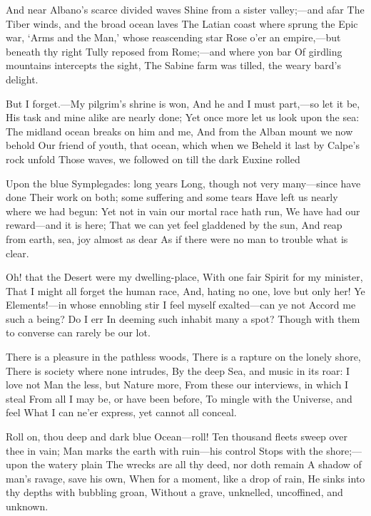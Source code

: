 \documentclass[10pt,twocolumn]{book}
\begin{document}
   And near Albano's scarce divided waves
   Shine from a sister valley;---and afar
   The Tiber winds, and the broad ocean laves
   The Latian coast where sprung the Epic war,
   `Arms and the Man,' whose reascending star
   Rose o'er an empire,---but beneath thy right
   Tully reposed from Rome;---and where yon bar
   Of girdling mountains intercepts the sight,
The Sabine farm was tilled, the weary bard's delight.


   But I forget.---My pilgrim's shrine is won,
   And he and I must part,---so let it be,\textemdash
   His task and mine alike are nearly done;
   Yet once more let us look upon the sea:
   The midland ocean breaks on him and me,
   And from the Alban mount we now behold
   Our friend of youth, that ocean, which when we
   Beheld it last by Calpe's rock unfold
Those waves, we followed on till the dark Euxine rolled


   Upon the blue Symplegades:  long years\textemdash
   Long, though not very many---since have done
   Their work on both; some suffering and some tears
   Have left us nearly where we had begun:
   Yet not in vain our mortal race hath run,
   We have had our reward---and it is here;
   That we can yet feel gladdened by the sun,
   And reap from earth, sea, joy almost as dear
As if there were no man to trouble what is clear.


   Oh! that the Desert were my dwelling-place,
   With one fair Spirit for my minister,
   That I might all forget the human race,
   And, hating no one, love but only her!
   Ye Elements!---in whose ennobling stir
   I feel myself exalted---can ye not
   Accord me such a being?  Do I err
   In deeming such inhabit many a spot?
Though with them to converse can rarely be our lot.


   There is a pleasure in the pathless woods,
   There is a rapture on the lonely shore,
   There is society where none intrudes,
   By the deep Sea, and music in its roar:
   I love not Man the less, but Nature more,
   From these our interviews, in which I steal
   From all I may be, or have been before,
   To mingle with the Universe, and feel
What I can ne'er express, yet cannot all conceal.

   Roll on, thou deep and dark blue Ocean---roll!
   Ten thousand fleets sweep over thee in vain;
   Man marks the earth with ruin---his control
   Stops with the shore;---upon the watery plain
   The wrecks are all thy deed, nor doth remain
   A shadow of man's ravage, save his own,
   When for a moment, like a drop of rain,
   He sinks into thy depths with bubbling groan,
Without a grave, unknelled, uncoffined, and unknown.
\end{document}
